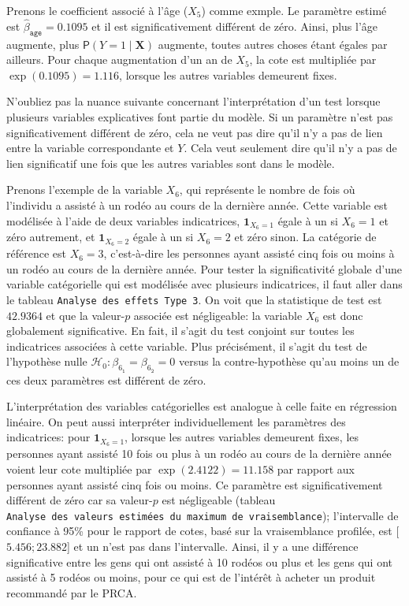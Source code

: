 \documentclass[
  11pt,
  letterpaper,
]{book}
\theoremstyle{definition}
\theoremstyle{definition}
\theoremstyle{definition}
\theoremstyle{remark}
\begin{document}
Prenons le coefficient associé à l'âge (\(X_5\)) comme exmple. Le paramètre estimé est \(\widehat{\beta}_{\texttt{age}}=0.1095\) et il est significativement différent de zéro. Ainsi, plus l'âge augmente, plus \({\mathsf P}\left(Y=1\mid \boldsymbol{X}\right)\) augmente, toutes autres choses étant égales par ailleurs. Pour chaque augmentation d'un an de \(X_5\), la cote est multipliée par \(\exp(0.1095)=1.116\), lorsque les autres variables demeurent fixes.

N'oubliez pas la nuance suivante concernant l'interprétation d'un test lorsque plusieurs variables explicatives font partie du modèle. Si un paramètre n'est pas significativement différent de zéro, cela ne veut pas dire qu'il n'y a pas de lien entre la variable correspondante et \(Y\). Cela veut seulement dire qu'il n'y a pas de lien significatif une fois que les autres variables sont dans le modèle.

Prenons l'exemple de la variable \(X_6\), qui représente le nombre de fois où l'individu a assisté à un rodéo au cours de la dernière année. Cette variable est modélisée à l'aide de deux variables indicatrices, \({\mathbf 1}_{X_6=1}\) égale à un si \(X_6=1\) et zéro autrement, et \({\mathbf 1}_{X_6=2}\) égale à un si \(X_6=2\) et zéro sinon. La catégorie de référence est \(X_6=3\), c'est-à-dire les personnes ayant assisté cinq fois ou moins à un rodéo au cours de la dernière année. Pour tester la significativité globale d'une variable catégorielle qui est modélisée avec plusieurs indicatrices, il faut aller dans le tableau \texttt{Analyse\ des\ effets\ Type\ 3}. On voit que la statistique de test est \(42.9364\) et que la valeur-\(p\) associée est négligeable: la variable \(X_6\) est donc globalement significative. En fait, il s'agit du test conjoint sur toutes les indicatrices associées à cette variable. Plus précisément, il s'agit du test de l'hypothèse nulle \(\mathcal{H}_0: \beta_{6_{\texttt{1}}}=\beta_{6_{\texttt{2}}}=0\) versus la contre-hypothèse qu'au moins un de ces deux paramètres est différent de zéro.

L'interprétation des variables catégorielles est analogue à celle faite en régression linéaire. On peut aussi interpréter individuellement les paramètres des indicatrices: pour \({\mathbf 1}_{X_6=1}\), lorsque les autres variables demeurent fixes, les personnes ayant assisté 10 fois ou plus à un rodéo au cours de la dernière année voient leur cote multipliée par \(\exp(2.4122)=11.158\) par rapport aux personnes ayant assisté cinq fois ou moins. Ce paramètre est significativement différent de zéro car sa valeur-\(p\) est négligeable (tableau \texttt{Analyse\ des\ valeurs\ estimées\ du\ maximum\ de\ vraisemblance}); l'intervalle de confiance à 95\% pour le rapport de cotes, basé sur la vraisemblance profilée, est {[}\(5.456; 23.882\){]} et un n'est pas dans l'intervalle. Ainsi, il y a une différence significative entre les gens qui ont assisté à 10 rodéos ou plus et les gens qui ont assisté à 5 rodéos ou moins, pour ce qui est de l'intérêt à acheter un produit recommandé par le PRCA.
\end{document}
